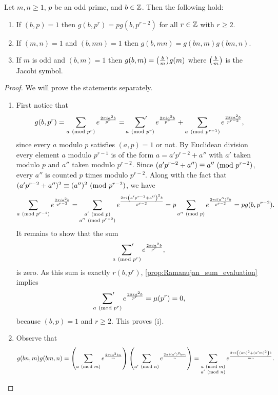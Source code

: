      \begin{proposition}\label{prop:quadratic_Gauss_sum_reduction}
        Let $m,n \ge 1$, $p$ be an odd prime, and $b \in \mathbb{Z}$. Then the following hold:
        \begin{enumerate}[label*=(\roman*)]
          \item If $(b,p) = 1$ then $g(b,p^{r}) = pg(b,p^{r-2})$ for all $r \in \mathbb{Z}$ with $r \ge 2$.
          \item If $(m,n) = 1$ and $(b,mn) = 1$ then $g(b,mn) = g(bn,m)g(bm,n)$.
          \item If $m$ is odd and $(b,m) = 1$ then $g(b,m) = \textstyle{\left(\frac{b}{m}\right)}g(m)$ where $\textstyle{\left(\frac{b}{m}\right)}$ is the Jacobi symbol.
        \end{enumerate}
      \end{proposition}
      \begin{proof}
        We will prove the statements separately.
        \begin{enumerate}[label*=(\roman*)]
          \item First notice that
          \[
            g(b,p^{r}) = \sum_{a \ (\mathrm{mod}\text{ }p^{r})}e^{\frac{2\pi ia^{2}b}{p^{r}}} = \sideset{}{'}\sum_{a \ (\mathrm{mod}\text{ }p^{r})}e^{\frac{2\pi ia^{2}b}{p^{r}}}+\sum_{a \ (\mathrm{mod}\text{ }p^{r-1})}e^{\frac{2\pi ia^{2}b}{p^{r-2}}},
          \]
          since every $a$ modulo $p$ satisfies $(a,p) = 1$ or not. By Euclidean division every element $a$ modulo $p^{r-1}$ is of the form $a = a'p^{r-2}+a''$ with $a'$ taken modulo $p$ and $a''$ taken modulo $p^{r-2}$. Since $(a'p^{r-2}+a'') \equiv a'' \ (\mathrm{mod}\text{ }p^{r-2})$, every $a''$ is counted $p$ times modulo $p^{r-2}$. Along with the fact that $(a'p^{r-2}+a'')^{2} \equiv (a'')^{2} \ (\mathrm{mod}\text{ }p^{r-2})$, we have
          \[
            \sum_{a \ (\mathrm{mod}\text{ }p^{r-1})}e^{\frac{2\pi ia^{2}b}{p^{r-2}}} = \sum_{\substack{a' \ (\mathrm{mod}\text{ }p) \\ a'' \ (\mathrm{mod}\text{ }p^{r-2})}}e^{\frac{2\pi i\left(a'p^{r-2}+a''\right)^{2}b}{p^{r-2}}} = p\sum_{a'' \ (\mathrm{mod}\text{ }p)}e^{\frac{2\pi i(a'')^{2}b}{p^{r-2}}} = pg(b,p^{r-2}).
          \]
          It remains to show that the sum
          \[
            \sideset{}{'}\sum_{a \ (\mathrm{mod}\text{ }p^{r})}e^{\frac{2\pi ia^{2}b}{p^{r}}},
          \]
          is zero. As this sum is exactly $r(b,p^{r})$, \cref{prop:Ramanujan_sum_evaluation} implies
          \[
            \sideset{}{'}\sum_{a \ (\mathrm{mod}\text{ }p^{r})}e^{\frac{2\pi ia^{2}b}{p^{r}}} = \mu(p^{r}) = 0,
          \]
          because $(b,p) = 1$ and $r \ge 2$. This proves (i).
          \item Observe that
            \[
              g(bn,m)g(bm,n) = \left(\sum_{a \ (\mathrm{mod}\text{ }m)}e^{\frac{2\pi ia^{2}bn}{m}}\right)\left(\sum_{a' \ (\mathrm{mod}\text{ }n)}e^{\frac{2\pi i(a')^{2}bm}{n}}\right) = \sum_{\substack{a \ (\mathrm{mod}\text{ }m) \\ a' \ (\mathrm{mod}\text{ }n)}}e^{\frac{2\pi i\left((an)^{2}+(a'm)^{2}\right)b}{mn}}.
\]
\end{enumerate}
\end{proof}
